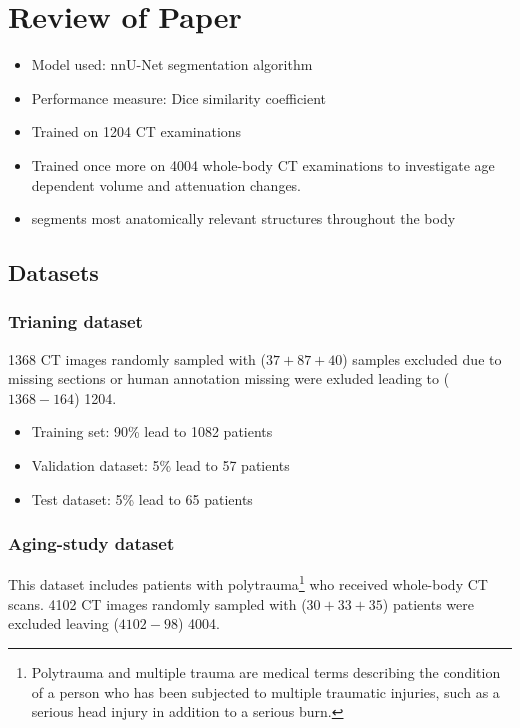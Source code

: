 \documentclass[11pt]{article}
\begin{document}


\tableofcontents

\clearpage

\section{Review of Paper}

\begin{itemize}
    \item Model used: nnU-Net segmentation algorithm
    \item Performance measure: Dice similarity coefficient
    \item Trained on 1204 CT examinations
    \item Trained once more on 4004 whole-body CT examinations to investigate age dependent volume and attenuation changes.
    \item segments most anatomically relevant structures
    throughout the body
\end{itemize}

\subsection{Datasets}

\subsubsection{Trianing dataset}

1368 CT images randomly sampled with ($37 + 87 + 40$) samples excluded due to missing sections or human annotation missing were exluded leading to ($1368-164$) 1204.

\begin{itemize}
    \item Training set: 90\% lead to 1082 patients
    \item Validation dataset: 5\% lead to 57 patients
    \item Test dataset: 5\% lead to 65 patients
\end{itemize}

\subsubsection{Aging-study dataset}

This dataset includes patients with polytrauma\footnote{Polytrauma and multiple trauma are medical terms describing the condition of a person who has been subjected to multiple traumatic injuries, such as a serious head injury in addition to a serious burn.} who received whole-body CT scans. 4102 CT images randomly sampled with ($30+33+35$) patients were excluded leaving ($4102-98$) 4004.
\end{document}
